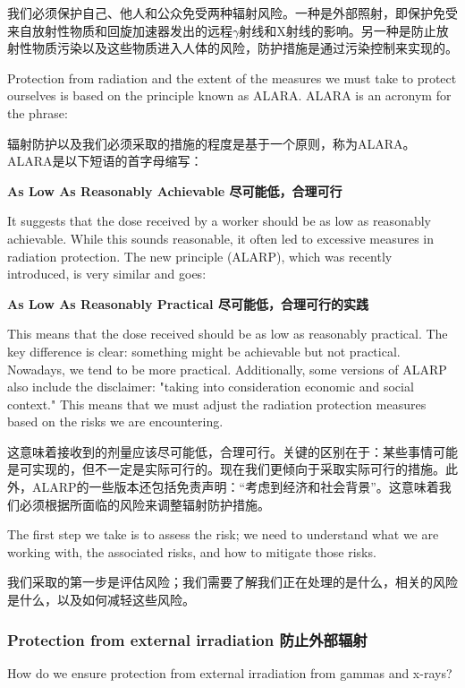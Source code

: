 \documentclass[dvipsnames, svgnames,a4paper,11pt]{article}
\begin{document}
我们必须保护自己、他人和公众免受两种辐射风险。一种是外部照射，即保护免受来自放射性物质和回旋加速器发出的远程$\gamma$射线和X射线的影响。另一种是防止放射性物质污染以及这些物质进入人体的风险，防护措施是通过污染控制来实现的。

Protection from radiation and the extent of the measures we must take to protect ourselves is based on the principle known as ALARA. ALARA is an acronym for the phrase:

辐射防护以及我们必须采取的措施的程度是基于一个原则，称为ALARA。ALARA是以下短语的首字母缩写：
\begin{center}
      \textbf{As Low As Reasonably Achievable 尽可能低，合理可行}
\end{center}

It suggests that the dose received by a worker should be as low as reasonably achievable. While this sounds reasonable, it often led to excessive measures in radiation protection. The new principle (ALARP), which was recently introduced, is very similar and goes:

\begin{center}
      \textbf{As Low As Reasonably Practical 尽可能低，合理可行的实践}
\end{center}


This means that the dose received should be as low as reasonably practical. The key difference is clear: something might be achievable but not practical. Nowadays, we tend to be more practical. Additionally, some versions of ALARP also include the disclaimer: "taking into consideration economic and social context." This means that we must adjust the radiation protection measures based on the risks we are encountering.

这意味着接收到的剂量应该尽可能低，合理可行。关键的区别在于：某些事情可能是可实现的，但不一定是实际可行的。现在我们更倾向于采取实际可行的措施。此外，ALARP的一些版本还包括免责声明：“考虑到经济和社会背景”。这意味着我们必须根据所面临的风险来调整辐射防护措施。

The first step we take is to assess the risk; we need to understand what we are working with, the associated risks, and how to mitigate those risks.

我们采取的第一步是评估风险；我们需要了解我们正在处理的是什么，相关的风险是什么，以及如何减轻这些风险。

\subsubsection{Protection from external irradiation 防止外部辐射}  
How do we ensure protection from external irradiation from gammas and x-rays?  
\end{document}
